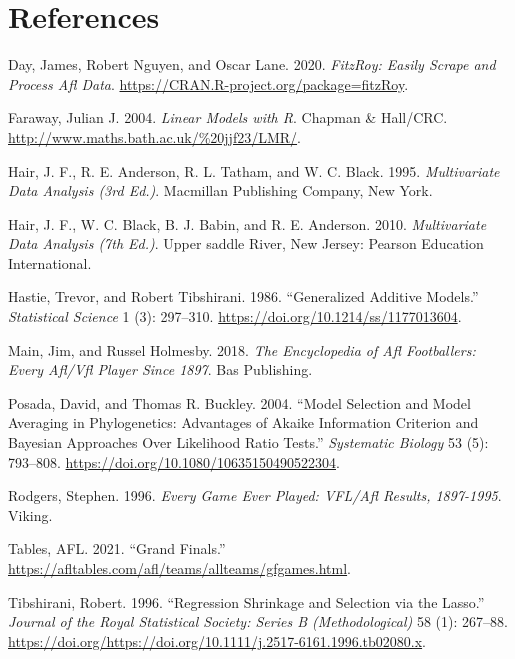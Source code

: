 \documentclass{article}
\begin{document}
\pagebreak

\hypertarget{references}{%
\section*{References}\label{references}}

\hypertarget{refs}{}
\leavevmode\hypertarget{ref-fitzRoy}{}%
Day, James, Robert Nguyen, and Oscar Lane. 2020. \emph{FitzRoy: Easily Scrape and Process Afl Data}. \url{https://CRAN.R-project.org/package=fitzRoy}.

\leavevmode\hypertarget{ref-R:Faraway:2004}{}%
Faraway, Julian J. 2004. \emph{Linear Models with R}. Chapman \& Hall/CRC. \url{http://www.maths.bath.ac.uk/\%20jjf23/LMR/}.

\leavevmode\hypertarget{ref-multi2}{}%
Hair, J. F., R. E. Anderson, R. L. Tatham, and W. C. Black. 1995. \emph{Multivariate Data Analysis (3rd Ed.)}. Macmillan Publishing Company, New York.

\leavevmode\hypertarget{ref-multi1}{}%
Hair, J. F., W. C. Black, B. J. Babin, and R. E. Anderson. 2010. \emph{Multivariate Data Analysis (7th Ed.)}. Upper saddle River, New Jersey: Pearson Education International.

\leavevmode\hypertarget{ref-10.1214ux2fssux2f1177013604}{}%
Hastie, Trevor, and Robert Tibshirani. 1986. ``Generalized Additive Models.'' \emph{Statistical Science} 1 (3): 297--310. \url{https://doi.org/10.1214/ss/1177013604}.

\leavevmode\hypertarget{ref-everyone}{}%
Main, Jim, and Russel Holmesby. 2018. \emph{The Encyclopedia of Afl Footballers: Every Afl/Vfl Player Since 1897}. Bas Publishing.

\leavevmode\hypertarget{ref-10.1080ux2f10635150490522304}{}%
Posada, David, and Thomas R. Buckley. 2004. ``Model Selection and Model Averaging in Phylogenetics: Advantages of Akaike Information Criterion and Bayesian Approaches Over Likelihood Ratio Tests.'' \emph{Systematic Biology} 53 (5): 793--808. \url{https://doi.org/10.1080/10635150490522304}.

\leavevmode\hypertarget{ref-everygame}{}%
Rodgers, Stephen. 1996. \emph{Every Game Ever Played: VFL/Afl Results, 1897-1995}. Viking.

\leavevmode\hypertarget{ref-attendance}{}%
Tables, AFL. 2021. ``Grand Finals.'' \url{https://afltables.com/afl/teams/allteams/gfgames.html}.

\leavevmode\hypertarget{ref-https:ux2fux2fdoi.orgux2f10.1111ux2fj.2517-6161.1996.tb02080.x}{}%
Tibshirani, Robert. 1996. ``Regression Shrinkage and Selection via the Lasso.'' \emph{Journal of the Royal Statistical Society: Series B (Methodological)} 58 (1): 267--88. \url{https://doi.org/https://doi.org/10.1111/j.2517-6161.1996.tb02080.x}.
\end{document}
